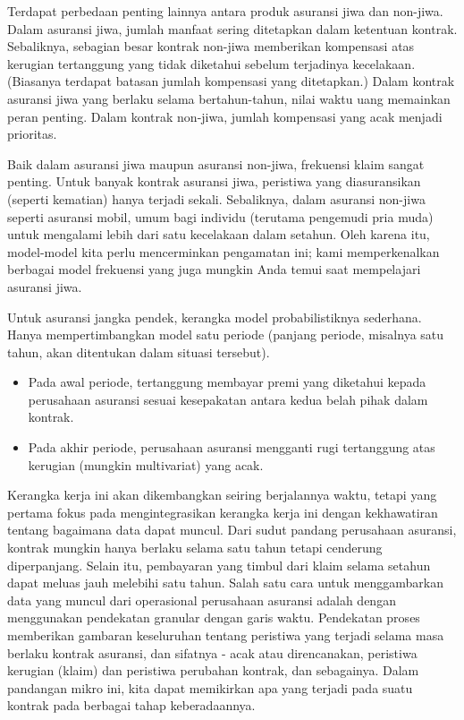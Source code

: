 \documentclass[
]{book}
\providecommand{\tightlist}{%
  \setlength{\itemsep}{0pt}\setlength{\parskip}{0pt}}
\begin{document}
Terdapat perbedaan penting lainnya antara produk asuransi jiwa dan non-jiwa. Dalam asuransi jiwa, jumlah manfaat sering ditetapkan dalam ketentuan kontrak. Sebaliknya, sebagian besar kontrak non-jiwa memberikan kompensasi atas kerugian tertanggung yang tidak diketahui sebelum terjadinya kecelakaan. (Biasanya terdapat batasan jumlah kompensasi yang ditetapkan.) Dalam kontrak asuransi jiwa yang berlaku selama bertahun-tahun, nilai waktu uang memainkan peran penting. Dalam kontrak non-jiwa, jumlah kompensasi yang acak menjadi prioritas.

Baik dalam asuransi jiwa maupun asuransi non-jiwa, frekuensi klaim sangat penting. Untuk banyak kontrak asuransi jiwa, peristiwa yang diasuransikan (seperti kematian) hanya terjadi sekali. Sebaliknya, dalam asuransi non-jiwa seperti asuransi mobil, umum bagi individu (terutama pengemudi pria muda) untuk mengalami lebih dari satu kecelakaan dalam setahun. Oleh karena itu, model-model kita perlu mencerminkan pengamatan ini; kami memperkenalkan berbagai model frekuensi yang juga mungkin Anda temui saat mempelajari asuransi jiwa.

Untuk asuransi jangka pendek, kerangka model probabilistiknya sederhana. Hanya mempertimbangkan model satu periode (panjang periode, misalnya satu tahun, akan ditentukan dalam situasi tersebut).

\begin{itemize}
\tightlist
\item
  Pada awal periode, tertanggung membayar premi yang diketahui kepada perusahaan asuransi sesuai kesepakatan antara kedua belah pihak dalam kontrak.
\item
  Pada akhir periode, perusahaan asuransi mengganti rugi tertanggung atas kerugian (mungkin multivariat) yang acak.
\end{itemize}

Kerangka kerja ini akan dikembangkan seiring berjalannya waktu, tetapi yang pertama fokus pada mengintegrasikan kerangka kerja ini dengan kekhawatiran tentang bagaimana data dapat muncul. Dari sudut pandang perusahaan asuransi, kontrak mungkin hanya berlaku selama satu tahun tetapi cenderung diperpanjang. Selain itu, pembayaran yang timbul dari klaim selama setahun dapat meluas jauh melebihi satu tahun. Salah satu cara untuk menggambarkan data yang muncul dari operasional perusahaan asuransi adalah dengan menggunakan pendekatan granular dengan garis waktu. Pendekatan proses memberikan gambaran keseluruhan tentang peristiwa yang terjadi selama masa berlaku kontrak asuransi, dan sifatnya - acak atau direncanakan, peristiwa kerugian (klaim) dan peristiwa perubahan kontrak, dan sebagainya. Dalam pandangan mikro ini, kita dapat memikirkan apa yang terjadi pada suatu kontrak pada berbagai tahap keberadaannya.
\end{document}
